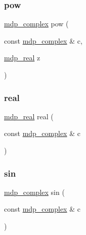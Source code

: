 \mbox{\label{classmdp__complex_ab20fc6334d41fa698d4ab5c4d83386b7}} 
\subsubsection{\texorpdfstring{pow}{pow}}
{\footnotesize\ttfamily \hyperlink{classmdp__complex}{mdp\+\_\+complex} pow (\begin{DoxyParamCaption}\item[{const \hyperlink{classmdp__complex}{mdp\+\_\+complex} \&}]{c,  }\item[{\hyperlink{mdp__global__vars_8h_a69d96b74c791e0bbdb888b3913a69450}{mdp\+\_\+real}}]{z }\end{DoxyParamCaption})\hspace{0.3cm}{\ttfamily [friend]}}

\mbox{\label{classmdp__complex_ac1595428e446b7ae72e170eabfd8b94f}} 
\subsubsection{\texorpdfstring{real}{real}}
{\footnotesize\ttfamily \hyperlink{mdp__global__vars_8h_a69d96b74c791e0bbdb888b3913a69450}{mdp\+\_\+real} real (\begin{DoxyParamCaption}\item[{const \hyperlink{classmdp__complex}{mdp\+\_\+complex} \&}]{c }\end{DoxyParamCaption})\hspace{0.3cm}{\ttfamily [friend]}}

\mbox{\label{classmdp__complex_ab01054c3b4d1c10d13833c8d069a09f6}} 
\subsubsection{\texorpdfstring{sin}{sin}}
{\footnotesize\ttfamily \hyperlink{classmdp__complex}{mdp\+\_\+complex} sin (\begin{DoxyParamCaption}\item[{const \hyperlink{classmdp__complex}{mdp\+\_\+complex} \&}]{c }\end{DoxyParamCaption})\hspace{0.3cm}{\ttfamily [friend]}}

